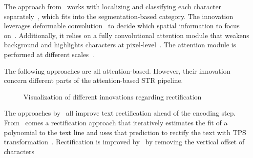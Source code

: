 The approach from~\cite{liao_scene_2018} works with localizing and classifying each character
separately~\citep{liao_scene_2018}, which fits into the segmentation-based category.
The innovation leverages deformable convolution~\citep{dai_deformable_2017} to decide
which spatial information to focus on~\citep{liao_scene_2018}.
Additionally, it relies on a fully convolutional attention module that weakens background and
highlights characters at pixel-level~\citep{liao_scene_2018}.
The attention module is performed at different scales~\citep{liao_scene_2018,xu_show_2016}.

The following approaches are all attention-based.
However, their innovation concern different parts of the attention-based \ac{STR} pipeline.
\begin{figure}[hb]
    \centering\scriptsize
    \caption{%
        Visualization of different innovations regarding
        rectification\label{fig:rectification-examples}
    }
\end{figure}
The approaches by~\cite{zhan_esir_2019,luo_multi-object_2019,shi_aster_2019} all improve
text rectification ahead of the encoding step.
From~\cite{zhan_esir_2019} comes a rectification approach that iteratively estimates the fit of a
polynomial to the text line and uses that prediction to rectify the text with \ac{TPS}
transformation~\citep{bookstein_principal_1989,zhan_esir_2019}.
Rectification is improved by~\cite{luo_multi-object_2019} by removing the vertical offset of characters
